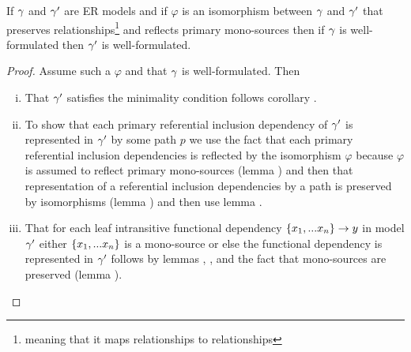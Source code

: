 \begin{lemma}
If $\gamma$ and $\gamma'$ are ER models and  if  $\varphi$ is an isomorphism between $\gamma$  and $\gamma'$ that preserves relationships\footnote{meaning that it maps relationships to relationships} and reflects primary mono-sources then if $\gamma$ is well-formulated then $\gamma'$ is well-formulated.
\end{lemma}
\begin{proof}
Assume such a $\varphi$ and that $\gamma$ is well-formulated. Then
\begin{enumerate} [(i)]
\item{
That $\gamma'$ satisfies the minimality condition follows corollary .
}
\item{ 
To show that each primary referential inclusion dependency of $\gamma'$ is represented in $\gamma'$ by some path $p$ we use the fact that each primary referential inclusion dependencies is reflected
by the isomorphism $\varphi$ because $\varphi$ is assumed to reflect primary mono-sources (lemma ) and then that representation of a referential inclusion dependencies by a path is  preserved by isomorphisms (lemma )
and then use lemma .
}
\item{
That for each leaf intransitive functional dependency $\left\{x_1,...x_n\right\} \rightarrow y$ in model $\gamma'$
either $\left\{x_1,...x_n\right\}$ is a mono-source 
or else the functional dependency is represented in $\gamma'$ 
follows by lemmas , ,
 and the fact that mono-sources are preserved (lemma ).
}
\end{enumerate}
\end{proof}
